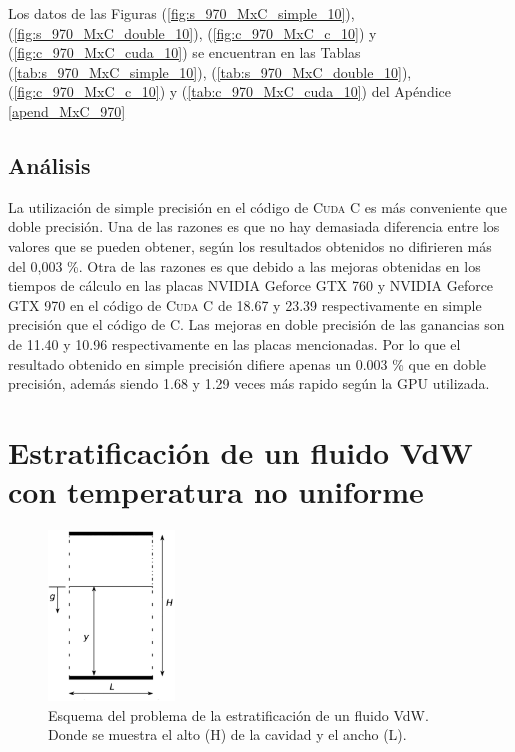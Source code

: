 Los datos de las Figuras (\ref{fig:s_970_MxC_simple_10}), (\ref{fig:s_970_MxC_double_10}), (\ref{fig:c_970_MxC_c_10}) y (\ref{fig:c_970_MxC_cuda_10}) se encuentran en las Tablas (\ref{tab:s_970_MxC_simple_10}), (\ref{tab:s_970_MxC_double_10}), (\ref{fig:c_970_MxC_c_10}) y (\ref{tab:c_970_MxC_cuda_10}) del Apéndice \ref{apend_MxC_970}


\subsection{Análisis}

La utilización de simple precisión en el código de \textsc{Cuda C} es más conveniente que doble precisión. Una de las razones es que no hay demasiada diferencia entre los valores que se pueden obtener, según los resultados obtenidos no difirieren más del 0,003 \%. Otra de las razones es que debido a las mejoras obtenidas en los tiempos de cálculo en las placas NVIDIA Geforce GTX 760 y NVIDIA Geforce GTX 970 en el código de \textsc{Cuda C} de 18.67 y 23.39 respectivamente en simple precisión que el código de \textsc{C}. Las mejoras en doble precisión de las ganancias son de 11.40 y 10.96 respectivamente en las placas mencionadas. Por lo que el resultado obtenido en simple precisión difiere apenas un 0.003 \% que en doble precisión, además siendo 1.68 y 1.29 veces más rapido según la GPU utilizada.



\section{Estratificación de un fluido VdW con temperatura no uniforme}

\begin{figure}[htbp]
	\centering
	\includegraphics[width=0.3\textwidth]{figs/cap4/esquema_problema_VdW}
	\caption{Esquema del problema de la estratificación de un fluido VdW. Donde se muestra el alto (H) de la cavidad y el ancho (L).} 
	\label{fig:esquema_VdW}	
\end{figure}

